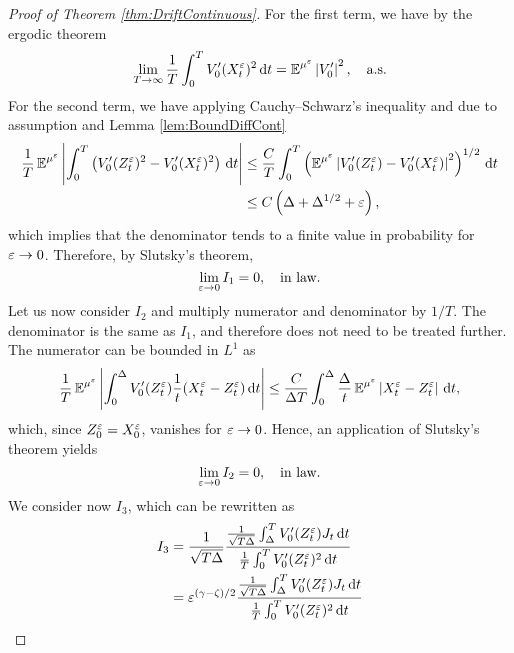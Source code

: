 \documentclass[10pt]{article}
\begin{document}
\begin{proof}[Proof of Theorem \ref{thm:DriftContinuous}]
	For the first term, we have by the ergodic theorem
	\begin{equation}
		\lim_{T\to\infty}\frac1T \int_0^T V_0'(X^\varepsilon_t)^2 \,\mathrm{d} t = \operatorname{\mathbb{E}}^{\mu^\varepsilon} \left\lvert V_0'\right\rvert^2, \quad \text{a.s.}
	\end{equation}
	For the second term, we have applying Cauchy--Schwarz's inequality and due to assumption  and Lemma \ref{lem:BoundDiffCont}
	\begin{equation}
	\begin{aligned}
		\frac1T \operatorname{\mathbb{E}}^{\mu^\varepsilon} \left\lvert\int_0^T \left(V_0'(Z^\varepsilon_t)^2 - V_0'(X^\varepsilon_t)^2 \right) \,\mathrm{d} t\right\rvert &\leq \frac{C}{T} \int_0^T \left(\operatorname{\mathbb{E}}^{\mu^\varepsilon} \left\lvert V_0'(Z^\varepsilon_t) - V_0'(X^\varepsilon_t)\right\rvert^2\right)^{1/2}\,\mathrm{d} t\\
		&\leq C \left(\Delta + \Delta^{1/2} + \varepsilon\right),
	\end{aligned}
	\end{equation}
	which implies that the denominator tends to a finite value in probability for $\varepsilon \to 0$. Therefore, by Slutsky's theorem,
	\begin{equation}
		\lim_{\varepsilon \to 0} I_1 = 0, \quad \text{in law}.
	\end{equation}
	Let us now consider $I_2$ and multiply numerator and denominator by $1/T$. The denominator is the same as $I_1$, and therefore does not need to be treated further. The numerator can be bounded in $L^1$ as
	\begin{equation}
	\frac1T \operatorname{\mathbb{E}}^{\mu^\varepsilon}\left\lvert\int_0^\Delta V_0'(Z^\varepsilon_t) \frac1t (X^\varepsilon_t - Z^\varepsilon_t) \,\mathrm{d} t\right\rvert \leq \frac{C}{\Delta T} \int_0^\Delta \frac{\Delta}{t}\operatorname{\mathbb{E}}^{\mu^\varepsilon}\left\lvert X^\varepsilon_t - Z^\varepsilon_t\right\rvert \,\mathrm{d} t,
	\end{equation}
	which, since $Z_0^\varepsilon = X_0^\varepsilon$, vanishes for $\varepsilon \to 0$. Hence, an application of Slutsky's theorem yields
	\begin{equation}
		\lim_{\varepsilon \to 0} I_2 = 0, \quad \text{in law}.
	\end{equation}
	We consider now $I_3$, which can be rewritten as
	\begin{equation}
	\begin{aligned}
		I_3 &= \frac{1}{\sqrt{T\Delta}}\frac{\frac{1}{\sqrt{T\Delta}}\int_\Delta^T V_0'(Z^\varepsilon_t) J_t \,\mathrm{d} t}{\frac1T\int_0^T V_0'(Z^\varepsilon_t)^2 \,\mathrm{d} t} \\
		&= \varepsilon^{(\gamma - \zeta)/2}\frac{\frac{1}{\sqrt{T\Delta}}\int_\Delta^T V_0'(Z^\varepsilon_t) J_t \,\mathrm{d} t}{\frac1T\int_0^T V_0'(Z^\varepsilon_t)^2 \,\mathrm{d} t}
	\end{aligned}
	\end{equation}

\end{proof}
\end{document}
